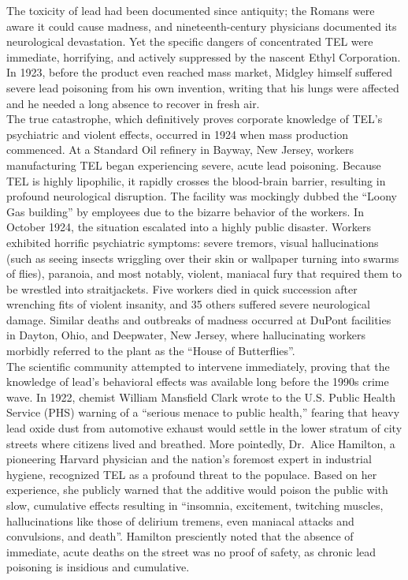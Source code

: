 \documentclass[
]{article}
\begin{document}
The toxicity of lead had been documented since antiquity; the Romans
were aware it could cause madness, and nineteenth-century physicians
documented its neurological devastation. Yet the specific dangers of
concentrated TEL were immediate, horrifying, and actively suppressed by
the nascent Ethyl Corporation. In 1923, before the product even reached
mass market, Midgley himself suffered severe lead poisoning from his own
invention, writing that his lungs were affected and he needed a long
absence to recover in fresh air.\\
The true catastrophe, which definitively proves corporate knowledge of
TEL's psychiatric and violent effects, occurred in 1924 when mass
production commenced. At a Standard Oil refinery in Bayway, New Jersey,
workers manufacturing TEL began experiencing severe, acute lead
poisoning. Because TEL is highly lipophilic, it rapidly crosses the
blood-brain barrier, resulting in profound neurological disruption. The
facility was mockingly dubbed the ``Loony Gas building'' by employees
due to the bizarre behavior of the workers. In October 1924, the
situation escalated into a highly public disaster. Workers exhibited
horrific psychiatric symptoms: severe tremors, visual hallucinations
(such as seeing insects wriggling over their skin or wallpaper turning
into swarms of flies), paranoia, and most notably, violent, maniacal
fury that required them to be wrestled into straitjackets. Five workers
died in quick succession after wrenching fits of violent insanity, and
35 others suffered severe neurological damage. Similar deaths and
outbreaks of madness occurred at DuPont facilities in Dayton, Ohio, and
Deepwater, New Jersey, where hallucinating workers morbidly referred to
the plant as the ``House of Butterflies''.\\
The scientific community attempted to intervene immediately, proving
that the knowledge of lead's behavioral effects was available long
before the 1990s crime wave. In 1922, chemist William Mansfield Clark
wrote to the U.S. Public Health Service (PHS) warning of a ``serious
menace to public health,'' fearing that heavy lead oxide dust from
automotive exhaust would settle in the lower stratum of city streets
where citizens lived and breathed. More pointedly, Dr.~Alice Hamilton, a
pioneering Harvard physician and the nation's foremost expert in
industrial hygiene, recognized TEL as a profound threat to the populace.
Based on her experience, she publicly warned that the additive would
poison the public with slow, cumulative effects resulting in ``insomnia,
excitement, twitching muscles, hallucinations like those of delirium
tremens, even maniacal attacks and convulsions, and death''. Hamilton
presciently noted that the absence of immediate, acute deaths on the
street was no proof of safety, as chronic lead poisoning is insidious
and cumulative.
\end{document}
